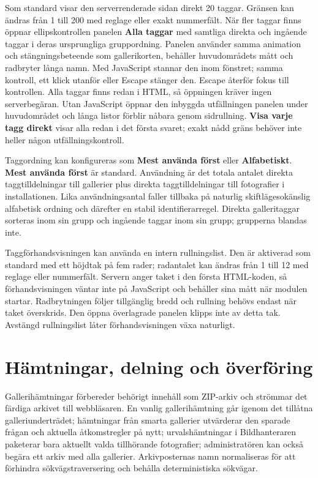 \documentclass[11pt,a4paper]{article}
\newcommand{\ui}[1]{\textbf{#1}}
\begin{document}
Som standard visar den serverrenderade sidan direkt 20 taggar. Gränsen kan
ändras från 1 till 200 med reglage eller exakt nummerfält. När fler taggar finns
öppnar ellipskontrollen panelen \ui{Alla taggar} med samtliga direkta och
ingående taggar i deras ursprungliga gruppordning. Panelen använder samma
animation och stängningsbeteende som gallerikorten, behåller huvudområdets mått
och radbryter långa namn. Med JavaScript stannar den inom fönstret; samma
kontroll, ett klick utanför eller Escape stänger den. Escape återför fokus till
kontrollen. Alla taggar finns redan i HTML, så öppningen kräver ingen
serverbegäran. Utan JavaScript öppnar den inbyggda utfällningen panelen under
huvudområdet och långa listor förblir nåbara genom sidrullning. \ui{Visa varje
tagg direkt} visar alla redan i det första svaret; exakt nådd gräns behöver inte
heller någon utfällningskontroll.

Taggordning kan konfigureras som \ui{Mest använda först} eller \ui{Alfabetiskt}.
\ui{Mest använda först} är standard. Användning är det totala antalet direkta
taggtilldelningar till gallerier plus direkta taggtilldelningar till fotografier
i installationen. Lika användningsantal faller tillbaka på naturlig
skiftlägesokänslig alfabetisk ordning och därefter en stabil identifierarregel.
Direkta galleritaggar sorteras inom sin grupp och ingående taggar inom sin
grupp; grupperna blandas inte.

Taggförhandsvisningen kan använda en intern rullningslist. Den är aktiverad som
standard med ett höjdtak på fem rader; radantalet kan ändras från 1 till 12 med
reglage eller nummerfält. Servern anger taket i den första HTML-koden, så
förhandsvisningen väntar inte på JavaScript och behåller sina mått när modulen
startar. Radbrytningen följer tillgänglig bredd och rullning behövs endast när
taket överskrids. Den öppna överlagrade panelen klipps inte av detta tak.
Avstängd rullningslist låter förhandsvisningen växa naturligt.


\section{Hämtningar, delning och överföring}
\label{sec:sharing}

Gallerihämtningar förbereder behörigt innehåll som ZIP-arkiv och strömmar det
färdiga arkivet till webbläsaren. En vanlig gallerihämtning går igenom det
tillåtna galleriunderträdet; hämtningar från smarta gallerier utvärderar den
sparade frågan och aktuella åtkomstregler på nytt; urvalshämtningar i
Bildhanteraren paketerar bara aktuellt valda tillhörande fotografier;
administratören kan också begära ett arkiv med alla gallerier. Arkivposternas
namn normaliseras för att förhindra sökvägstraversering och behålla
deterministiska sökvägar.
\end{document}
